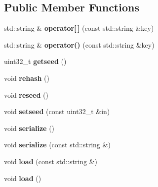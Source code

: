 \subsection*{Public Member Functions}
\begin{DoxyCompactItemize}
\item 
\hypertarget{classfastgenematch_1_1Geneobject_a69326e96a8d2cdfedee2c44f3ca2eb0b}{
std::string \& {\bfseries operator\mbox{[}$\,$\mbox{]}} (const std::string \&key)}
\label{classfastgenematch_1_1Geneobject_a69326e96a8d2cdfedee2c44f3ca2eb0b}

\item 
\hypertarget{classfastgenematch_1_1Geneobject_a5d0fad4b7c244be239901c6e794cf1f5}{
std::string \& {\bfseries operator()} (const std::string \&key)}
\label{classfastgenematch_1_1Geneobject_a5d0fad4b7c244be239901c6e794cf1f5}

\item 
\hypertarget{classfastgenematch_1_1Geneobject_a2542e61f0e78690217e94e89c386ec24}{
uint32\_\-t {\bfseries getseed} ()}
\label{classfastgenematch_1_1Geneobject_a2542e61f0e78690217e94e89c386ec24}

\item 
\hypertarget{classfastgenematch_1_1Geneobject_a775dded873cb868027048baee7fce0a9}{
void {\bfseries rehash} ()}
\label{classfastgenematch_1_1Geneobject_a775dded873cb868027048baee7fce0a9}

\item 
\hypertarget{classfastgenematch_1_1Geneobject_a36e67a37874e46d4655d8e688d975852}{
void {\bfseries reseed} ()}
\label{classfastgenematch_1_1Geneobject_a36e67a37874e46d4655d8e688d975852}

\item 
\hypertarget{classfastgenematch_1_1Geneobject_ad1359c68213e594b5aa600bff1e10f64}{
void {\bfseries setseed} (const uint32\_\-t \&in)}
\label{classfastgenematch_1_1Geneobject_ad1359c68213e594b5aa600bff1e10f64}

\item 
\hypertarget{classfastgenematch_1_1Geneobject_a4dd2f125e2915ee2c59b09f20e329721}{
void {\bfseries serialize} ()}
\label{classfastgenematch_1_1Geneobject_a4dd2f125e2915ee2c59b09f20e329721}

\item 
\hypertarget{classfastgenematch_1_1Geneobject_a23178da06dc9ff52d58a7d3ba7e87a76}{
void {\bfseries serialize} (const std::string \&)}
\label{classfastgenematch_1_1Geneobject_a23178da06dc9ff52d58a7d3ba7e87a76}

\item 
\hypertarget{classfastgenematch_1_1Geneobject_a4532439959e22fb1618dd240a382d313}{
void {\bfseries load} (const std::string \&)}
\label{classfastgenematch_1_1Geneobject_a4532439959e22fb1618dd240a382d313}

\item 
\hypertarget{classfastgenematch_1_1Geneobject_a4bab27f711113a8f86066c1b40491d18}{
void {\bfseries load} ()}
\label{classfastgenematch_1_1Geneobject_a4bab27f711113a8f86066c1b40491d18}

\end{DoxyCompactItemize}
